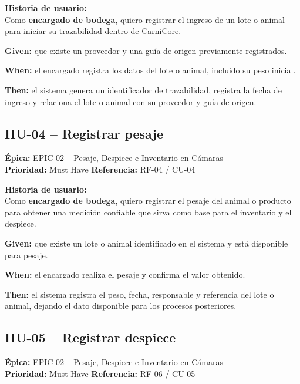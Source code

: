 \documentclass[11pt,a4paper]{article}
\begin{document}
\medskip
\textbf{Historia de usuario:}\\
Como \textbf{encargado de bodega}, quiero registrar el ingreso de un lote o animal para
iniciar su trazabilidad dentro de CarniCore.

\begin{tcolorbox}[colback=lightblue,colframe=uteqblue,title=\textbf{BDD -- Criterio de aceptación}]
\textbf{Given:} que existe un proveedor y una guía de origen previamente registrados.

\medskip
\textbf{When:} el encargado registra los datos del lote o animal, incluido su peso inicial.

\medskip
\textbf{Then:} el sistema genera un identificador de trazabilidad, registra la fecha de ingreso
y relaciona el lote o animal con su proveedor y guía de origen.
\end{tcolorbox}

\subsection{HU-04 -- Registrar pesaje}
\textbf{Épica:} EPIC-02 -- Pesaje, Despiece e Inventario en Cámaras\\
\textbf{Prioridad:} Must Have \quad \textbf{Referencia:} RF-04 / CU-04

\medskip
\textbf{Historia de usuario:}\\
Como \textbf{encargado de bodega}, quiero registrar el pesaje del animal o producto para
obtener una medición confiable que sirva como base para el inventario y el despiece.

\begin{tcolorbox}[colback=lightblue,colframe=uteqblue,title=\textbf{BDD -- Criterio de aceptación}]
\textbf{Given:} que existe un lote o animal identificado en el sistema y está disponible para pesaje.

\medskip
\textbf{When:} el encargado realiza el pesaje y confirma el valor obtenido.

\medskip
\textbf{Then:} el sistema registra el peso, fecha, responsable y referencia del lote o animal,
dejando el dato disponible para los procesos posteriores.
\end{tcolorbox}

\subsection{HU-05 -- Registrar despiece}
\textbf{Épica:} EPIC-02 -- Pesaje, Despiece e Inventario en Cámaras\\
\textbf{Prioridad:} Must Have \quad \textbf{Referencia:} RF-06 / CU-05
\end{document}
